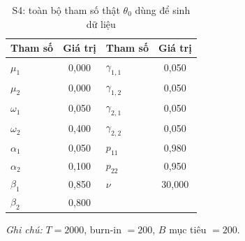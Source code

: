 \documentclass[11pt,a4paper]{article}
\begin{document}
\begin{table}[H]\centering\small
\caption{S4: toàn bộ tham số thật $\theta_0$ dùng để sinh dữ liệu}
\begin{tabularx}{\textwidth}{l C  l C}
\toprule
\textbf{Tham số} & \textbf{Giá trị} & \textbf{Tham số} & \textbf{Giá trị} \\
\midrule
$\mu_1$ & 0{,}000 & $\gamma_{1,1}$ & 0{,}050 \\
$\mu_2$ & 0{,}000 & $\gamma_{1,2}$ & 0{,}050 \\
$\omega_1$ & 0{,}050 & $\gamma_{2,1}$ & 0{,}050 \\
$\omega_2$ & 0{,}400 & $\gamma_{2,2}$ & 0{,}050 \\
$\alpha_1$ & 0{,}050 & $p_{11}$ & 0{,}980 \\
$\alpha_2$ & 0{,}100 & $p_{22}$ & 0{,}950 \\
$\beta_1$ & 0{,}850 & $\nu$ & 30{,}000 \\
$\beta_2$ & 0{,}800 & & \\
\bottomrule
\end{tabularx}
\vspace{0.2em}\raggedright\scriptsize \emph{Ghi chú:} $T=2000$, burn-in $=200$, $B$ mục tiêu $=200$.
\end{table}
\end{document}
